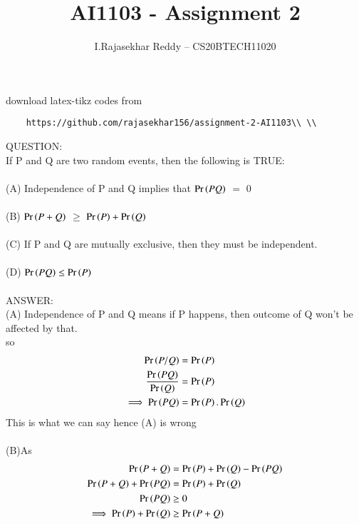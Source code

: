 \documentclass[journal,12pt,twocolumn]{IEEEtran}
\begin{document}
	\def\rightbox#1{\makebox[0in][r]{#1}}
	\def\centbox#1{\makebox[0in]{#1}}
	\def\topbox#1{\raisebox{-\baselineskip}[0in][0in]{#1}}
	\def\midbox#1{\raisebox{-0.5\baselineskip}[0in][0in]{#1}}
	\vspace{3cm}
	\title{AI1103 - Assignment 2}
	\author{I.Rajasekhar Reddy -- CS20BTECH11020}
	\maketitle
	\newpage
	\bigskip
	\renewcommand{\thefigure}{\theenumi}
	\renewcommand{\thetable}{\theenumi}
	download latex-tikz codes from 
	\begin{lstlisting}
	https://github.com/rajasekhar156/assignment-2-AI1103\\ \\
	\end{lstlisting}
	QUESTION:\\
	If P and Q are two random events, then the
	following is TRUE:\\ \\
	(A) Independence of P and Q implies that $\Pr\left(PQ\right)$ $=$ 0 \\ \\
	(B) $\Pr\left(P+Q\right)$ $\geq$ $\Pr\left(P\right) + \Pr\left(Q\right)$ \\ \\
	(C) If P and Q are mutually exclusive, then they must be independent.\\ \\
	(D) $\Pr\left(P Q\right) \leq \Pr\left(P\right)$\\ \\
	ANSWER:\\
	(A) Independence of P and Q means if P happens, then outcome of Q won't be affected by that.\\
	so \begin{align}
		\Pr\left(P/Q\right) &= \Pr\left(P\right) \\
		\frac{\Pr\left(P Q\right)}{\Pr\left(Q\right)} &= \Pr\left(P\right) \\
		\implies  \Pr\left(P Q\right) &= \Pr\left(P\right).\Pr\left(Q\right)
	\end{align}
	This is what we can say hence (A) is wrong \\ \\
	(B)As \begin{align}
		\Pr\left(P + Q\right) &= \Pr\left(P\right) + \Pr\left(Q\right) -\Pr\left(P Q\right) \\
		\Pr\left(P + Q\right) + \Pr\left(P Q\right) &= \Pr\left(P\right) + \Pr\left(Q\right) \\
		\Pr\left(P Q\right) &\geq 0 \\
		\implies \Pr\left(P\right) + \Pr\left(Q\right) &\geq \Pr\left(P + Q\right)
	\end{align}
\end{document}
